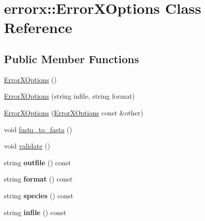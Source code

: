 \hypertarget{classerrorx_1_1_error_x_options}{}\section{errorx\+:\+:Error\+X\+Options Class Reference}
\label{classerrorx_1_1_error_x_options}
\subsection*{Public Member Functions}
\begin{DoxyCompactItemize}
\item 
\mbox{\hyperlink{classerrorx_1_1_error_x_options_afec5f241bdc2f5c4a33ae46437c734e7}{Error\+X\+Options}} ()
\item 
\mbox{\hyperlink{classerrorx_1_1_error_x_options_aa516ca1b14de8755901247249f1f467f}{Error\+X\+Options}} (string infile, string format)
\item 
\mbox{\hyperlink{classerrorx_1_1_error_x_options_a350346cf42cb7349a3975fcc27c51cbd}{Error\+X\+Options}} (\mbox{\hyperlink{classerrorx_1_1_error_x_options}{Error\+X\+Options}} const \&other)
\item 
void \mbox{\hyperlink{classerrorx_1_1_error_x_options_ac45f2c55e8c2dddbbceb5bbdc0acc06f}{fastq\+\_\+to\+\_\+fasta}} ()
\item 
void \mbox{\hyperlink{classerrorx_1_1_error_x_options_a8da4777cb965ad3ef9af136704e4fa62}{validate}} ()
\item 
\mbox{\label{classerrorx_1_1_error_x_options_aa1f76c83216f5390f10b6b0594fef709}} 
string {\bfseries outfile} () const
\item 
\mbox{\label{classerrorx_1_1_error_x_options_a8405ace3a12055908950573263771e21}} 
string {\bfseries format} () const
\item 
\mbox{\label{classerrorx_1_1_error_x_options_a1b79f7ab48dc25a4349f0bfb13047204}} 
string {\bfseries species} () const
\item 
\mbox{\label{classerrorx_1_1_error_x_options_aab0542f0e3e8d378bb9bc1e0c8f55884}} 
string {\bfseries infile} () const
\item 
\mbox{\label{classerrorx_1_1_error_x_options_aec14f032e11a898359f71fc286c0d45a}} 

\end{DoxyCompactItemize}
